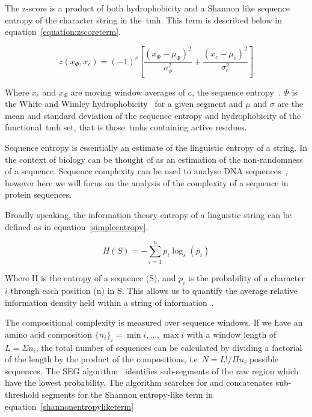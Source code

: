 The z-score is a product of both hydrophobicity and a Shannon like sequence entropy \cite{Wong2011, Wong2012} of the character string in the~\gls{tmh}. This term is described below in equation~\ref{equation:zscoreterm}.

\begin{equation} \label{equation:zscoreterm}
z({x}_{\Phi},{x}_{c})={(-1)}^{s}\left[\frac{{({x}_{\Phi}-{\mu}_{\Phi})}^{2}}{{\sigma}_{\phi}^{2}}+\frac{{({x}_{c}-{\mu}_{c})}^{2}}{{\sigma}_{c}^{2}}\right]
\end{equation}

Where $x_c$ and $x_\Phi$ are moving window averages of c, the sequence entropy~\cite{Wootton1996}. $\Phi$ is the White and Wimley hydrophobicity~\cite{White1999} for a given segment and $\mu$ and $\sigma$ are the mean and standard deviation of the sequence entropy and hydrophobicity of the functional~\gls{tmh} set, that is those~\gls{tmh}s containing active residues.

Sequence entropy is essentially an estimate of the linguistic entropy of a string.
In the context of biology can be thought of as an estimation of the non-randomness of a sequence.
Sequence complexity can be used to analyse DNA sequences~\cite{Pinho2013, Oliver1993, Troyanskaya2002}, however here we will focus on the analysis of the complexity of a sequence in protein sequences.

Broadly speaking, the information theory entropy of a linguistic string can be defined as in equation~\ref{simpleentropy}.

\begin{equation} \label{simpleentropy}
	H(S)=-{\sum_{i=1}^n {p_i\log_s(p_i)}}
\end{equation}

Where H is the entropy of a sequence (S), and $p_i$ is the probability of a character $i$ through each position (n) in S. This allows us to quantify the average relative information density held within a string of information~\cite{Shannon1948}.

The compositional complexity is measured over sequence windows. If we have an amino acid composition $\{{{n}_{i}}{\}}_{i}={\min{i}},\ldots,{\max{i}}$ with a window length of $L=\Sigma {n}_i $, the total number of sequences can be calculated by dividing a factorial of the length by the product of the compositions, i.e\  $ N = L!/\Pi{n}_i $ possible sequences.
The SEG algorithm~\cite{WOOTTON1994269, Wootton1996} identifies sub-segments of the raw region which have the lowest probability.
The algorithm searches for and concatenates sub-threshold segments for the Shannon entropy-like term in equation~\ref{shannonentropyliketerm}

